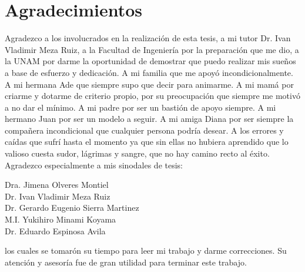 \chapter*{Agradecimientos}

\justify Agradezco a los involucrados en la realización de esta tesis, a mi tutor Dr. Ivan Vladimir Meza Ruiz, a la Facultad de Ingeniería por la preparación que me dio, a la UNAM por darme la oportunidad de demostrar que puedo realizar mis sueños a base de esfuerzo y dedicación. A mi familia que me apoyó incondicionalmente. A mi hermana Ade que siempre supo que decir para animarme. A mi mamá por criarme y dotarme de criterio propio, por su preocupación que siempre me motivó a no dar el mínimo. A mi padre por ser un bastión de apoyo siempre. A mi hermano Juan por ser un modelo a seguir. A mi amiga Diana por ser siempre la compañera incondicional que cualquier persona podría desear. A los errores y caídas que sufrí hasta el momento ya que sin ellas no hubiera aprendido que lo valioso cuesta sudor, lágrimas y sangre, que no hay camino recto al éxito.
\justify Agradezco especialmente a mis sinodales de tesis:
\begin{center}
	Dra. Jimena Olveres Montiel\\
	Dr. Ivan Vladimir Meza Ruiz\\
	Dr. Gerardo Eugenio Sierra Martinez\\
	M.I. Yukihiro Minami Koyama\\
	Dr. Eduardo Espinosa Avila\\
\end{center}
\justify los cuales se tomarón su tiempo para leer mi trabajo y darme correcciones. Su atención y asesoría fue de gran utilidad para terminar este trabajo.